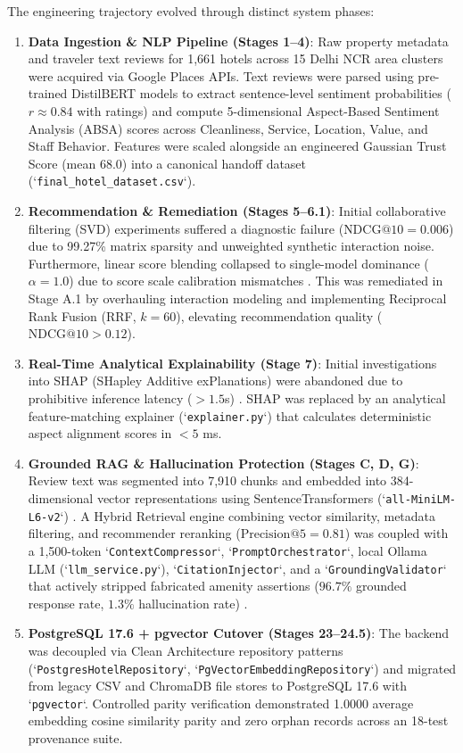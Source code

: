 The engineering trajectory evolved through distinct system phases:
\begin{enumerate}
    \item \textbf{Data Ingestion \& NLP Pipeline (Stages 1--4)}: Raw property metadata and traveler text reviews for 1,661 hotels across 15 Delhi NCR area clusters were acquired via Google Places APIs. Text reviews were parsed using pre-trained DistilBERT models to extract sentence-level sentiment probabilities ($r \approx 0.84$ with ratings) and compute 5-dimensional Aspect-Based Sentiment Analysis (ABSA) scores across Cleanliness, Service, Location, Value, and Staff Behavior. Features were scaled alongside an engineered Gaussian Trust Score (mean $68.0$) into a canonical handoff dataset (`\texttt{final\_hotel\_dataset.csv}`).
    \item \textbf{Recommendation \& Remediation (Stages 5--6.1)}: Initial collaborative filtering (SVD) experiments suffered a diagnostic failure ($\text{NDCG}@10 = 0.006$) due to 99.27\% matrix sparsity and unweighted synthetic interaction noise. Furthermore, linear score blending collapsed to single-model dominance ($\alpha = 1.0$) due to score scale calibration mismatches \cite{Cormack2009}. This was remediated in Stage A.1 by overhauling interaction modeling and implementing Reciprocal Rank Fusion (RRF, $k=60$), elevating recommendation quality ($\text{NDCG}@10 > 0.12$).
    \item \textbf{Real-Time Analytical Explainability (Stage 7)}: Initial investigations into SHAP (SHapley Additive exPlanations) were abandoned due to prohibitive inference latency ($> 1.5$s) \cite{Lundberg2017}. SHAP was replaced by an analytical feature-matching explainer (`\texttt{explainer.py}`) that calculates deterministic aspect alignment scores in $< 5$ ms.
    \item \textbf{Grounded RAG \& Hallucination Protection (Stages C, D, G)}: Review text was segmented into 7,910 chunks and embedded into 384-dimensional vector representations using SentenceTransformers (`\texttt{all-MiniLM-L6-v2}`) \cite{Reimers2019}. A Hybrid Retrieval engine combining vector similarity, metadata filtering, and recommender reranking ($\text{Precision}@5 = 0.81$) was coupled with a 1,500-token `\texttt{ContextCompressor}`, `\texttt{PromptOrchestrator}`, local Ollama LLM (`\texttt{llm\_service.py}`), `\texttt{CitationInjector}`, and a `\texttt{GroundingValidator}` that actively stripped fabricated amenity assertions ($96.7\%$ grounded response rate, $1.3\%$ hallucination rate) \cite{Lewis2020}.
    \item \textbf{PostgreSQL 17.6 + pgvector Cutover (Stages 23--24.5)}: The backend was decoupled via Clean Architecture repository patterns (`\texttt{PostgresHotelRepository}`, `\texttt{PgVectorEmbeddingRepository}`) and migrated from legacy CSV and ChromaDB file stores to PostgreSQL 17.6 with `\texttt{pgvector}`. Controlled parity verification demonstrated 1.0000 average embedding cosine similarity parity and zero orphan records across an 18-test provenance suite.

\end{enumerate}
